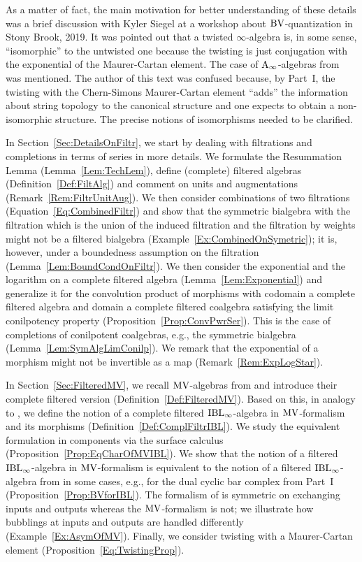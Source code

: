 \documentclass[\MainFolder/Text.tex]{subfiles}
\begin{document}
As a matter of fact, the main motivation for better understanding of these details was a brief discussion with Kyler Siegel at a workshop about $\mathrm{BV}$-quantization in Stony Brook, 2019. It was pointed out that a twisted $\infty$-algebra is, in some sense, ``isomorphic'' to the untwisted one because the twisting is just conjugation with the exponential of the Maurer-Cartan element. The case of $\mathrm{A}_\infty$-algebras from~\cite{FOOOI} was mentioned. The author of this text was confused because, by Part~I, the twisting with the Chern-Simons Maurer-Cartan element ``adds'' the information about string topology to the canonical structure and one expects to obtain a non-isomorphic structure. The precise notions of isomorphisms needed to be clarified.

In Section~\ref{Sec:DetailsOnFiltr}, we start by dealing with filtrations and completions in terms of series in more details. We formulate the Resummation Lemma (Lemma~\ref{Lem:TechLem}), define (complete) filtered algebras (Definition~\ref{Def:FiltAlg}) and comment on units and augmentations (Remark~\ref{Rem:FiltrUnitAug}). We then consider combinations of two filtrations (Equation~\eqref{Eq:CombinedFiltr}) and show that the symmetric bialgebra with the filtration which is the union of the induced filtration and the filtration by weights might not be a filtered bialgebra (Example~\ref{Ex:CombinedOnSymetric}); it is, however, under a boundedness assumption on the filtration (Lemma~\ref{Lem:BoundCondOnFiltr}). We then consider the exponential and the logarithm on a complete filtered algebra (Lemma~\ref{Lem:Exponential}) and generalize it for the convolution product of morphisms with codomain a complete filtered algebra and domain a complete filtered coalgebra satisfying the limit conilpotency property (Proposition~\ref{Prop:ConvPwrSer}). This is the case of completions of conilpotent coalgebras, e.g., the symmetric bialgebra (Lemma~\ref{Lem:SymAlgLimConilp}). We remark that the exponential of a morphism might not be invertible as a map (Remark~\ref{Rem:ExpLogStar}).

In Section~\ref{Sec:FilteredMV}, we recall $\mathrm{MV}$-algebras from \cite{Markl2015} and introduce their complete filtered version (Definition~\ref{Def:FilteredMV}). Based on this, in analogy to \cite{Markl2015}, we define the notion of a complete filtered $\mathrm{IBL}_\infty$-algebra in $\mathrm{MV}$-formalism and its morphisms (Definition~\ref{Def:ComplFiltrIBL}). We study the equivalent formulation in components via the surface calculus (Proposition~\ref{Prop:EqCharOfMVIBL}). We show that the notion of a filtered $\mathrm{IBL}_\infty$-algebra in $\mathrm{MV}$-formalism is equivalent to the notion of a filtered $\mathrm{IBL}_\infty$-algebra from \cite{Cieliebak2015} in some cases, e.g., for the dual cyclic bar complex from Part~I (Proposition~\ref{Prop:BVforIBL}). The formalism of \cite{Cieliebak2015} is symmetric on exchanging inputs and outputs whereas the $\mathrm{MV}$-formalism is not; we illustrate how bubblings at inputs and outputs are handled differently (Example~\ref{Ex:AsymOfMV}). Finally, we consider twisting with a Maurer-Cartan element (Proposition~\ref{Eq:TwistingProp}).
\end{document}
